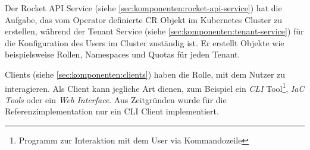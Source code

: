 Der Rocket API Service (siehe \ref{sec:komponenten:rocket-api-service}) hat die Aufgabe, 
das vom Operator definierte \ac{CR} Objekt im Kubernetes Cluster zu erstellen,
während der Tenant Service (siehe \ref{sec:komponenten:tenant-service}) für die Konfiguration des Users im Cluster zuständig ist.
Er erstellt Objekte wie beispielsweise Rollen, Namespaces und Quotas für jeden Tenant.

Clients (siehe \ref{sec:komponenten:clients}) haben die Rolle, mit dem Nutzer zu interagieren. 
Als Client kann jegliche Art dienen, zum Beispiel ein \emph{\ac{CLI}} Tool\footnote{Programm zur Interaktion mit dem User via Kommandozeile}, 
\emph{\ac{IaC} Tools} oder ein \emph{Web Interface}. Aus Zeitgründen wurde für die Referenzimplementation nur
ein \ac{CLI} Client implementiert.

